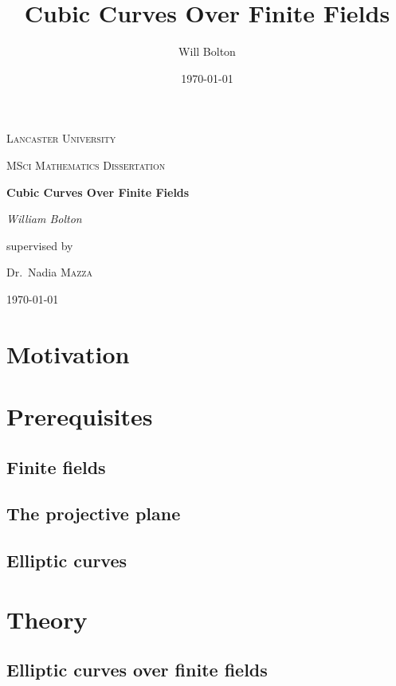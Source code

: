 \documentclass[a4paper,12pt,titlepage,oneside]{article}
\title{Cubic Curves Over Finite Fields}
\author{Will Bolton}
\date{\today}
\begin{document}
\begin{titlepage}
	\centering
	{\scshape\LARGE Lancaster University \par}
	\vspace{1cm}
	{\scshape\Large MSci Mathematics Dissertation\par}
	\vspace{1.5cm}
	{\huge\bfseries Cubic Curves Over Finite Fields\par}
	\vspace{2cm}
	{\Large\itshape William Bolton\par}
	\vfill
	supervised by\par
	Dr.~Nadia \textsc{Mazza}

	\vfill

	{\large \today\par}
\end{titlepage}
\tableofcontents
\clearpage

\section*{Motivation}

\clearpage

\section{Prerequisites}
\label{prerequisite-section}
\subsection{Finite fields}

\subsection{The projective plane}

\subsection{Elliptic curves}

\clearpage

\section{Theory}
\label{theory-section}
\subsection{Elliptic curves over finite fields}

\end{document}
